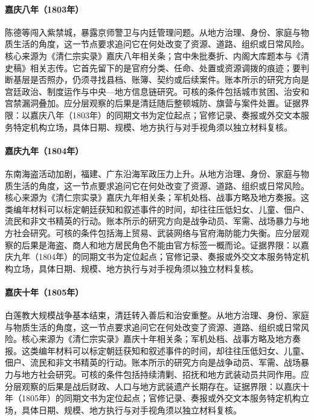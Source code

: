 \hypertarget{social:EQ-1803-FORBIDDEN-CITY-ATTACK}{}\paragraph{嘉庆八年（1803年）}陈德等闯入紫禁城，暴露京师警卫与内廷管理问题。从地方治理、身份、家庭与物质生活的角度，这一节点要求追问它在何处改变了资源、道路、组织或日常风险。核心来源为《清仁宗实录》嘉庆八年相关条；宫中朱批奏折、内阁大库题本与《清史稿》相关志传。它首先留下的是官府分类、任命、处置或资源调拨的痕迹；要判断基层是否照办，仍须寻找县档、账簿、契约或后续案件。账本所示的研究方向是宫廷政治、制度运作与中央—地方信息链研究。可核的条件包括城市贫困、治安和宫禁漏洞叠加。应分层观察的后果是清廷随后整顿城防、旗营与案件处置。证据界限：以嘉庆八年（1803年）的同期文书为定位起点；官修记录、奏报或外交文本服务特定机构立场，具体日期、规模、地方执行与对手视角须以独立材料复核。
\hypertarget{social:EQ-1804-COASTAL-PIRACY}{}\paragraph{嘉庆九年（1804年）}东南海盗活动加剧，福建、广东沿海军政压力上升。从地方治理、身份、家庭与物质生活的角度，这一节点要求追问它在何处改变了资源、道路、组织或日常风险。核心来源为《清仁宗实录》嘉庆九年相关条；军机处档、战事方略及地方奏报。这类编年材料可以标定朝廷获知和叙述事件的时间，却往往压低妇女、儿童、佃户、流民和非文书精英的行动。账本所示的研究方向是战争动员、军需、战场暴力与地方社会研究。可核的条件包括海上贸易、武装网络与官府海防能力失衡。应分层观察的后果是海盗、商人和地方居民角色不能由官方标签一概而论。证据界限：以嘉庆九年（1804年）的同期文书为定位起点；官修记录、奏报或外交文本服务特定机构立场，具体日期、规模、地方执行与对手视角须以独立材料复核。
\hypertarget{social:EQ-1805-WHITE-LOTUS-WAR-END}{}\paragraph{嘉庆十年（1805年）}白莲教大规模战争基本结束，清廷转入善后和治安重整。从地方治理、身份、家庭与物质生活的角度，这一节点要求追问它在何处改变了资源、道路、组织或日常风险。核心来源为《清仁宗实录》嘉庆十年相关条；军机处档、战事方略及地方奏报。这类编年材料可以标定朝廷获知和叙述事件的时间，却往往压低妇女、儿童、佃户、流民和非文书精英的行动。账本所示的研究方向是战争动员、军需、战场暴力与地方社会研究。可核的条件包括持续清剿、招抚和地方武装动员共同作用。应分层观察的后果是战后财政、人口与地方武装遗产长期存在。证据界限：以嘉庆十年（1805年）的同期文书为定位起点；官修记录、奏报或外交文本服务特定机构立场，具体日期、规模、地方执行与对手视角须以独立材料复核。
